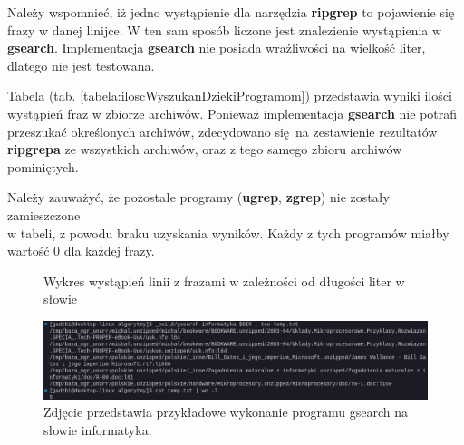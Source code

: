 Należy wspomnieć, iż jedno wystąpienie dla narzędzia \textbf{ripgrep} to pojawienie się frazy
w danej linijce. W ten sam sposób liczone jest znalezienie wystąpienia w \textbf{gsearch}.
Implementacja \textbf{gsearch} nie posiada wrażliwości na wielkość liter, dlatego nie 
jest testowana.

Tabela (tab. \ref{tabela:iloscWyszukanDziekiProgramom}) przedstawia wyniki ilości 
wystąpień fraz w zbiorze archiwów. Ponieważ implementacja \textbf{gsearch} nie potrafi
przeszukać określonych archiwów, zdecydowano się na zestawienie rezultatów
\textbf{ripgrepa} ze wszystkich archiwów, oraz z tego samego zbioru archiwów pominiętych. 

Należy zauważyć, że pozostałe programy (\textbf{ugrep}, \textbf{zgrep}) nie 
zostały zamieszczone \\ w tabeli, z powodu braku uzyskania wyników.
Każdy z tych programów miałby wartość 0 dla każdej frazy.

\begin{figure}[htbp]
    \centering
    \caption{Wykres wystąpień linii z frazami w zależności od długości liter w słowie }
    \label{fig:wykresPorównaniaIlosciWystapień}
\end{figure}

\begin{figure}[htbp]
    \centering
    \includegraphics[width=\textwidth]{./images/gsearch-result-informatyka.png}
    \caption{Zdjęcie przedstawia przykładowe wykonanie programu gsearch na słowie informatyka.}
    \label{fig:wykonanieProgramuGsearch}
\end{figure}


